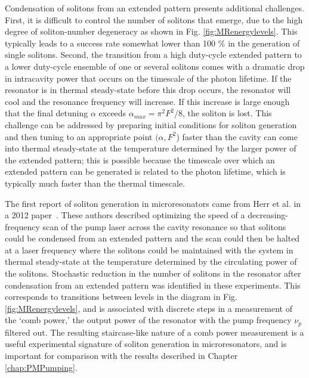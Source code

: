 Condensation of solitons from an extended pattern presents additional challenges. First, it is difficult to control the number of solitons that emerge, due to the high degree of soliton-number degeneracy as shown in Fig. \ref{fig:MRenergylevels}. This typically leads to a success rate somewhat lower than 100 $\%$ in the generation of single solitons. Second, the transition from a high duty-cycle extended pattern to a lower duty-cycle ensemble of one or several solitons comes with a dramatic drop in intracavity power that occurs on the timescale of the photon lifetime. If the resonator is in thermal steady-state before this drop occurs, the resonator will cool and the resonance frequency will increase. If this increase is large enough that the final detuning $\alpha$ exceeds $\alpha_{max}=\pi^2 F^2/8$, the soliton is lost. This challenge can be addressed by preparing initial conditions for soliton generation and then tuning to an appropriate point $(\alpha,F^2$) faster than the cavity can come into thermal steady-state at the temperature determined by the larger power of the extended pattern; this is possible because the timescale over which an extended pattern can be generated is related to the photon lifetime, which is typically much faster than the thermal timescale.

The first report of soliton generation in microresonators came from Herr et al. in a 2012 paper~\cite{Herr2012a}. These authors described optimizing the speed of a decreasing-frequency scan of the pump laser across the cavity resonance so that solitons could be condensed from an extended pattern and the scan could then be halted at a laser frequency where the solitons could be maintained with the system in thermal steady-state at the temperature determined by the circulating power of the solitons. Stochastic reduction in the number of solitons in the resonator after condensation from an extended pattern was identified in these experiments. This corresponds to transitions between levels in the diagram in Fig. \ref{fig:MRenergylevels}, and is associated with discrete steps in a measurement of the `comb power,' the output power of the resonator with the pump frequency $\nu_p$ filtered out. The resulting staircase-like nature of a comb power measurement is a useful experimental signature of soliton generation in microresonators, and is important for comparison with the results described in Chapter \ref{chap:PMPumping}.


